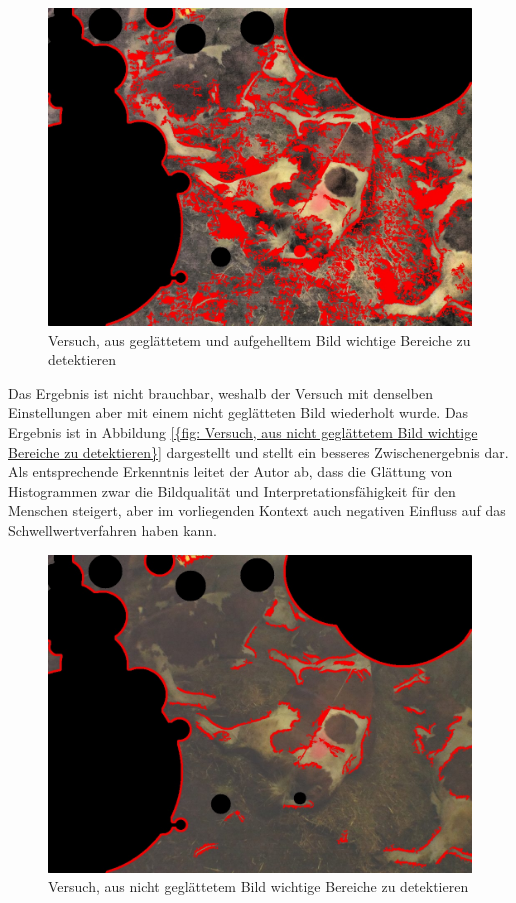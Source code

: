 \begin{figure}[H]
	\center
	\includegraphics[scale=0.43]{Grafiken/entwicklung/10thresholdedEqualizedBirghtened.jpg}
	\caption{Versuch, aus geglättetem und aufgehelltem Bild wichtige Bereiche zu detektieren} 
	\label{fig: Versuch, aus geglättetem und aufgehelltem Bild wichtige Bereiche zu detektieren} 
\end{figure}

Das Ergebnis ist nicht brauchbar, weshalb der Versuch mit denselben Einstellungen aber mit einem nicht geglätteten Bild wiederholt wurde. Das Ergebnis ist in Abbildung \ref{{fig: Versuch, aus nicht geglättetem Bild wichtige Bereiche zu detektieren}} dargestellt und stellt ein besseres Zwischenergebnis dar. Als entsprechende Erkenntnis leitet der Autor ab, dass die Glättung von Histogrammen zwar die Bildqualität und Interpretationsfähigkeit für den Menschen steigert, aber im vorliegenden Kontext auch negativen Einfluss auf das Schwellwertverfahren haben kann.

\begin{figure}[H]
	\center
	\includegraphics[scale=0.43]{Grafiken/entwicklung/11thresholdedNotEqualized.jpg}
	\caption{Versuch, aus nicht geglättetem Bild wichtige Bereiche zu detektieren} 
	\label{fig: Versuch, aus nicht geglättetem Bild wichtige Bereiche zu detektieren} 
\end{figure}

